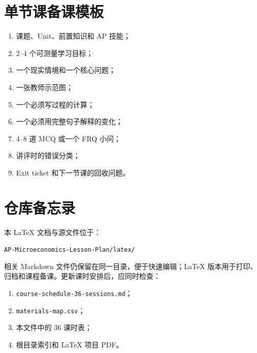 \documentclass[11pt,a4paper]{ctexart}
\newcommand{\resource}[1]{\texttt{\small #1}}
\begin{document}
\section{单节课备课模板}

\begin{enumerate}[leftmargin=2em]
  \item 课题、Unit、前置知识和 AP 技能；
  \item 2--4 个可测量学习目标；
  \item 一个现实情境和一个核心问题；
  \item 一张教师示范图；
  \item 一个必须写过程的计算；
  \item 一个必须用完整句子解释的变化；
  \item 4--8 道 MCQ 或一个 FRQ 小问；
  \item 讲评时的错误分类；
  \item Exit ticket 和下一节课的回收问题。
\end{enumerate}

\section{仓库备忘录}

本 LaTeX 文档与源文件位于：

\begin{center}
\resource{AP-Microeconomics-Lesson-Plan/latex/}
\end{center}

相关 Markdown 文件仍保留在同一目录，便于快速编辑；LaTeX 版本用于打印、归档和课程备课。更新课时安排后，应同时检查：

\begin{enumerate}[leftmargin=2em]
  \item \resource{course-schedule-36-sessions.md}；
  \item \resource{materials-map.csv}；
  \item 本文件中的 36 课时表；
  \item 根目录索引和 LaTeX 项目 PDF。
\end{enumerate}
\end{document}
